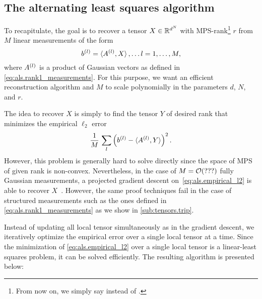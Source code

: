 \subsection{The alternating least squares algorithm}%
\label{sub:als.algorithm}

To recapitulate, the goal is to recover a tensor $X \in {\mathbb{R}}^{d^N}$ with MPS-rank\footnote{%
  From now on, we simply say  instead of .
} $r$ from $M$ linear measurements of the form
\[
  b^{(l)} = \braket{A^{(l)}, X}, \ldots l=1,\ldots,M,
\]
where $A^{(l)}$ is a product of Gaussian vectors as defined in \cref{eq:als.rank1_measurements}.
For this purpose, we want an efficient reconstruction algorithm and $M$ to scale polynomially in the parameters $d$, $N$, and $r$.

The idea to recover $X$ is simply to find the tensor $Y$ of desired rank that minimizes the empirical $\ell_2$ error
\[
  \frac{1}{M} \, \sum_l \left( b^{(l)} - \braket{A^{(l)}, Y} \right)^2.
  \label{eq:als.empirical_l2}
\]
However, this problem is generally hard to solve directly since the space of MPS of given rank is non-convex.
Nevertheless, in the case of $M={\mathcal{O}}(???)$ fully Gaussian measurements, a projected gradient descent on~\eqref{eq:als.empirical_l2} is able to recover $X$~\cite{Rauhut_2014_Tensor,Rauhut_2016_Low}.
However, the same proof techniques fail in the case of structured measurements such as the ones defined in \cref{eq:als.rank1_measurements} as we show in \cref{sub:tensors.trip}.

Instead of updating all local tensor simultaneously as in the gradient descent, we iteratively optimize the empirical error over a single local tensor at a time.
Since the minimization of \cref{eq:als.empirical_l2} over a single local tensor is a linear-least squares problem, it can be solved efficiently.
The resulting algorithm is presented below:

